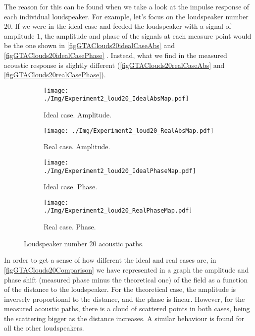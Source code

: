 The reason for this can be found when we take a look at the impulse response of each individual loudspeaker. For example, let's focus on the loudspeaker number $20$. If we were in the ideal case and feeded the loudspeaker with a signal of amplitude $1$, the amplitude and phase of the signals at each measure point would be the one shown in \autoref{figGTAClouds20idealCaseAbs} and \autoref{figGTAClouds20idealCasePhase} . Instead, what we find in the measured acoustic response is slightly different (\autoref{figGTAClouds20realCaseAbs} and \autoref{figGTAClouds20realCasePhase}).

\begin{figure}
	\centering
	\begin{subfigure}[b]{0.24\textwidth}
		\centering
		\texttt{[image: ./Img/Experiment2\_loud20\_IdealAbsMap.pdf]}
		\caption{Ideal case. Amplitude.}
		\label{figGTAClouds20idealCaseAbs}
	\end{subfigure}
		\begin{subfigure}[b]{0.24\textwidth}
		\centering
		\texttt{[image: ./Img/Experiment2\_loud20\_RealAbsMap.pdf]}
		\caption{Real case. Amplitude.}
		\label{figGTAClouds20idealCasePhase}		
	\end{subfigure}
	\begin{subfigure}[b]{0.24\textwidth}
		\centering
		\texttt{[image: ./Img/Experiment2\_loud20\_IdealPhaseMap.pdf]}
		\caption{Ideal case. Phase.}
		\label{figGTAClouds20realCaseAbs}
	\end{subfigure}
	\begin{subfigure}[b]{0.24\textwidth}
		\centering
		\texttt{[image: ./Img/Experiment2\_loud20\_RealPhaseMap.pdf]}
		\caption{Real case. Phase.}
		\label{figGTAClouds20realCasePhase}
	\end{subfigure}
	\caption{Loudspeaker number 20 acoustic paths.}
	\label{figGTAClouds20}
\end{figure}

In order to get a sense of how different the ideal and real cases are, in \autoref{figGTAClouds20Comparison} we have represented in a graph the amplitude and phase shift (measured phase minus the theoretical one) of the field as a function of the distance to the loudspeaker. For the theoretical case, the amplitude is inversely proportional to the distance, and the phase is linear. However, for the measured acoustic paths, there is a cloud of scattered points in both cases, being the scattering bigger as the distance increases. A similar behaviour is found for all the other loudspeakers.

